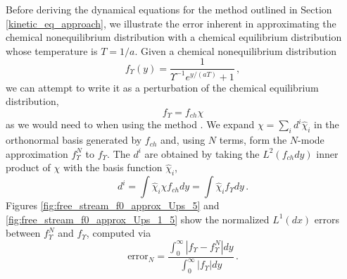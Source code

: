 \label{basis_comparison}
Before deriving the dynamical equations for the method outlined in Section \ref{kinetic_eq_approach}, we illustrate the error inherent in approximating the chemical nonequilibrium distribution   with a  chemical equilibrium distribution  whose temperature is $T=1/a$.   Given a chemical nonequilibrium distribution 
\begin{equation}\label{zeroth_approx}
f_\Upsilon (y)=\frac{1}{\Upsilon^{-1}e^{y/(aT)}+1}\,,
\end{equation}
 we can attempt to write it as a perturbation of the chemical equilibrium distribution,  
\begin{equation}\label{chi_def}
f_\Upsilon=f_{ch}\chi
\end{equation} as we would need to when using the method .  We expand $\chi=\sum_i d^i\hat\chi_i$ in the orthonormal basis generated by $f_{ch}$ and, using $N$ terms, form the $N$-mode approximation $f_\Upsilon^N$ to $f_\Upsilon$.  The $d^i$ are obtained by taking the $L^2(f_{ch}dy)$ inner product of $\chi$ with the basis function $\hat\chi_i$,
\begin{equation}
d^i=\int\hat\chi_i \chi f_{ch}dy=\int\hat\chi_i  f_\Upsilon dy\,.
\end{equation}
 Figures \ref{fig:free_stream_f0_approx_Ups_5} and \ref{fig:free_stream_f0_approx_Ups_1_5} show the normalized $L^1(dx)$ errors between $f_\Upsilon^N$ and $f_\Upsilon$, computed via
\begin{equation}
\text{error}_N=\frac{\int_0^\infty |f_\Upsilon -f_\Upsilon ^N|dy}{\int_0^\infty |f_\Upsilon |dy}\,.
\end{equation}
